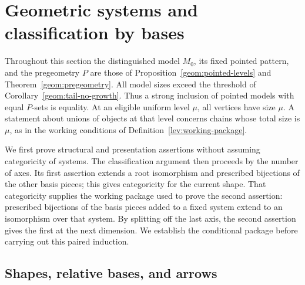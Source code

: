 \section{Geometric systems and classification by bases}
\label{sys:section-geometric-systems}

Throughout this section the distinguished model $M_0$, its fixed pointed
pattern, and the pregeometry $P$ are those of
Proposition~\ref{geom:pointed-levels} and
Theorem~\ref{geom:pregeometry}.
All model sizes exceed the threshold of
Corollary~\ref{geom:tail-no-growth}.  Thus a strong inclusion of pointed
models with equal $P$-sets is equality.  At an eligible uniform level
$\mu$, all vertices have size $\mu$.  A statement about unions of
objects at that level concerns chains whose total size is $\mu$, as in
the working conditions of Definition~\ref{lev:working-package}.

We first prove structural and presentation assertions without assuming
categoricity of systems.  The classification argument then proceeds by
the number of axes.  Its first assertion extends a root isomorphism and
prescribed bijections of the other basis pieces; this gives categoricity
for the current shape.  That categoricity supplies the working package
used to prove the second assertion: prescribed bijections of the basis
pieces added to a fixed system extend to an isomorphism over that system.
By splitting off the last axis, the second assertion gives the first at
the next dimension.  We establish the conditional package before carrying
out this paired induction.

\subsection{Shapes, relative bases, and arrows}

